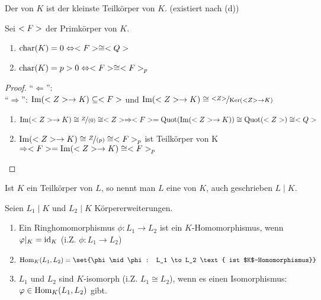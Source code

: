 \begin{definition}[Primkörper]
	Der  von $K$ ist der kleinste Teilkörper von $K$. (existiert nach (d)) %
\end{definition}

\begin{proposition}
	Sei $<F>$ der Primkörper von $K$.
	\begin{enumerate}[label=(\alph*)]
		\item $\operatorname{char}(K)  = 0 \Leftrightarrow <F> \cong <Q>$
		\item $\operatorname{char}(K)  = p > 0 \Leftrightarrow <F> \cong <F>_p$
	\end{enumerate}
\end{proposition}

\begin{proof}
	``$\Leftarrow$'': \\ %
	``$\Rightarrow$'': $\operatorname{Im}(<Z> \to K) \subseteq <F>$ und $\Image(\Z \to K) \cong \lnkset{\Z}{\Ker(\Z \to K)}$
	\begin{enumerate}[label=(\alph*)]
		\item $\Image(\Z \to K) \cong \lnkset{Z}{(0)} \cong \Z \Rightarrow \field = \Quot(\Image(\Z \to K)) \cong \Quot(\Z) \cong \Q$
		\item $\Image(\Z \to K) \cong \lnkset{Z}{(p)} \cong \Fp$ ist Teilkörper von K $\Rightarrow <F> = \operatorname{Im}(<Z> \to K) \cong <F>_p$
	\end{enumerate}
\end{proof}

\begin{definition}[Körpererweiterung]
	Ist $K$ ein Teilkörper von $L$, so nennt man $L$ eine  von $K$, auch geschrieben $L \mid K$.
\end{definition}

\begin{definition}[$K$-Homomorphismus]
	Seien $L_1 \mid K$ und $L_2 \mid K$ Körpererweiterungen.
	\begin{enumerate}[label=(\alph*)]
		\item Ein Ringhomomorphismus $\phi\colon L_1 \to L_2$ ist ein $K$-Homomorphismus, wenn $\varphi\vert_K = \operatorname{id}_K$ (i.Z. $\phi: L_1 \to L_2$)
		\item $\Hom_K(L_1,L_2) = \set{\phi \mid \phi: L_1 \to L_2 \text{ ist $K$-Homomorphismus}}$
		\item $L_1$ und $L_2$ sind $K$-isomorph (i.Z. $L_1 \cong L_2$), wenn es einen Isomorphismus: $\varphi \in \operatorname{Hom}_K(L_1, L_2)$ gibt.
	\end{enumerate}
\end{definition}

